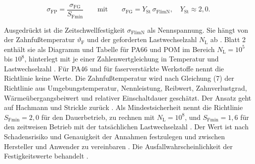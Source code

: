 \begin{equation}
    \sigma_{\mathrm{FP}} = \frac{\sigma_{\mathrm{FG}}}{S_{\mathrm{Fmin}}} \qquad \text{mit} \qquad \sigma_{\mathrm{FG}} = Y_{\mathrm{St}}\,\sigma_{\mathrm{FlimN}} , \quad Y_{\mathrm{St}} \approx 2{,}0 .
    \label{eq:sigma_fp_vdi}
\end{equation}

Ausgedrückt ist die Zeitschwellfestigkeit $\sigma_{\mathrm{FlimN}}$ als Nennspannung. Sie hängt von der Zahnfußtemperatur $\vartheta_{\mathrm{F}}$ und der geforderten Lastwechselzahl $N_{\mathrm{L}}$ ab \cite[S.~14]{VDI2736-2}. Blatt 2 enthält sie als Diagramm und Tabelle für PA66 und POM im Bereich $N_{\mathrm{L}} = 10^{5}$ bis $10^{8}$, hinterlegt mit je einer Zahlenwertgleichung in Temperatur und Lastwechselzahl \cite[S.~14 bis 15]{VDI2736-2}. Für PA46 und für faserverstärkte Werkstoffe nennt die Richtlinie keine Werte. Die Zahnfußtemperatur wird nach Gleichung (7) der Richtlinie aus Umgebungstemperatur, Nennleistung, Reibwert, Zahnverlustgrad, Wärmeübergangsbeiwert und relativer Einschaltdauer geschätzt. Der Ansatz geht auf Hachmann und Strickle zurück \cite[S.~8 und 30]{VDI2736-2}. Als Mindestsicherheit nennt die Richtlinie $S_{\mathrm{Fmin}} = 2{,}0$ für den Dauerbetrieb, zu rechnen mit $N_{\mathrm{L}} = 10^{8}$, und $S_{\mathrm{Fmin}} = 1{,}6$ für den zeitweisen Betrieb mit der tatsächlichen Lastwechselzahl \cite[S.~14]{VDI2736-2}. Der Wert ist nach Schadensrisiko und Genauigkeit der Annahmen festzulegen und zwischen Hersteller und Anwender zu vereinbaren \cite[S.~14]{VDI2736-2}. Die Ausfallwahrscheinlichkeit der Festigkeitswerte behandelt .


